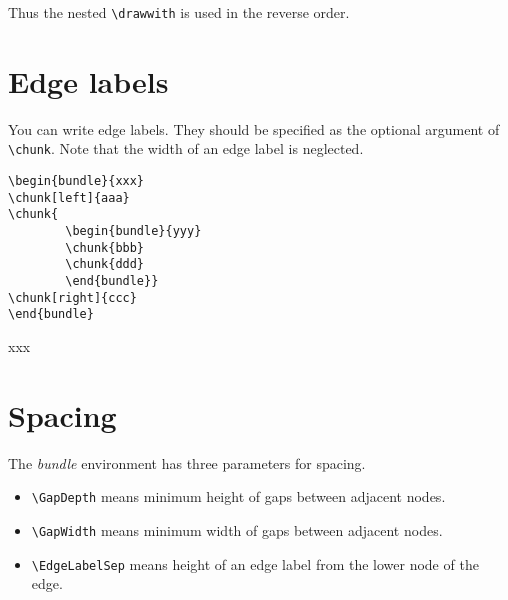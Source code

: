Thus the nested \verb|\drawwith| is used in the reverse order.

\section{Edge labels}

You can write edge labels. They should be specified as the optional
argument of \verb|\chunk|. Note that the width of an edge label
is neglected. 

\drawwith{\drawline}
\noindent\begin{minipage}{0.6\textwidth}
\begin{verbatim}
\begin{bundle}{xxx}
\chunk[left]{aaa}
\chunk{
        \begin{bundle}{yyy}
        \chunk{bbb}
        \chunk{ddd}
        \end{bundle}}
\chunk[right]{ccc}
\end{bundle}
\end{verbatim}
\end{minipage}\begin{minipage}{0.4\textwidth}
\begin{bundle}{xxx}
\end{bundle}
\end{minipage}



\section{Spacing}

The {\it bundle} environment
has three parameters for spacing.

\begin{itemize}

\item \verb|\GapDepth| means minimum height of gaps between
adjacent nodes.

\item \verb|\GapWidth| means minimum width of gaps between
adjacent nodes.

\item \verb|\EdgeLabelSep| means height of an edge label
from the lower node of the edge.

\end{itemize}

